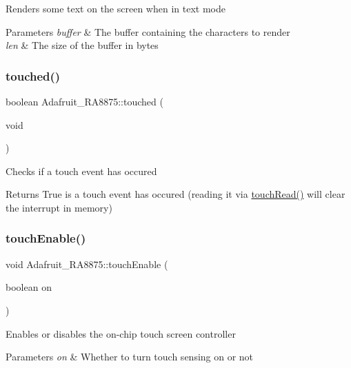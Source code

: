 Renders some text on the screen when in text mode


\begin{DoxyParams}{Parameters}
{\em buffer} & The buffer containing the characters to render \\
\hline
{\em len} & The size of the buffer in bytes \\
\hline
\end{DoxyParams}
\mbox{\label{class_adafruit___r_a8875_ac5d283dee07e8da46e71a1de1394d1c3}} 
\subsubsection{\texorpdfstring{touched()}{touched()}}
{\footnotesize\ttfamily boolean Adafruit\+\_\+\+R\+A8875\+::touched (\begin{DoxyParamCaption}\item[{void}]{ }\end{DoxyParamCaption})}

Checks if a touch event has occured

\begin{DoxyReturn}{Returns}
True is a touch event has occured (reading it via \mbox{\hyperlink{class_adafruit___r_a8875_a04a9dc3c75a81429b27630470da8f95d}{touch\+Read()}} will clear the interrupt in memory) 
\end{DoxyReturn}
\mbox{\label{class_adafruit___r_a8875_a16c340772d8f313e1ec937058b6dbdd7}} 
\subsubsection{\texorpdfstring{touchEnable()}{touchEnable()}}
{\footnotesize\ttfamily void Adafruit\+\_\+\+R\+A8875\+::touch\+Enable (\begin{DoxyParamCaption}\item[{boolean}]{on }\end{DoxyParamCaption})}

Enables or disables the on-\/chip touch screen controller


\begin{DoxyParams}{Parameters}
{\em on} & Whether to turn touch sensing on or not \\
\hline
\end{DoxyParams}
\mbox{\label{class_adafruit___r_a8875_a04a9dc3c75a81429b27630470da8f95d}} 
